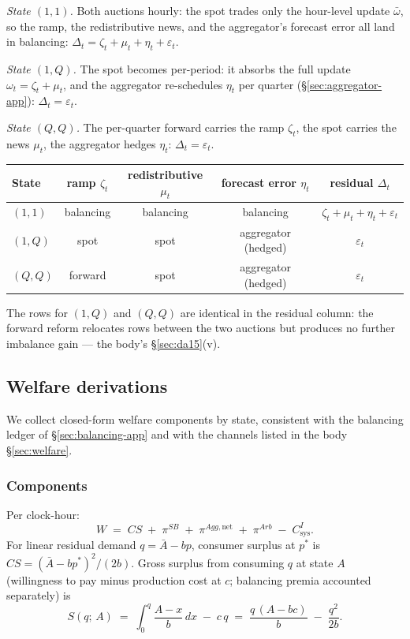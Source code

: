 \documentclass[11pt,a4paper]{article}
\theoremstyle{definition}
\theoremstyle{remark}
\theoremstyle{plain}
\begin{document}
\emph{State $(1,1)$.} Both auctions hourly: the spot trades only the hour-level update $\bar\omega$, so the ramp, the redistributive news, and the aggregator's forecast error all land in balancing: $\Delta_t = \zeta_t + \mu_t + \eta_t + \varepsilon_t$.

\emph{State $(1,Q)$.} The spot becomes per-period: it absorbs the full update $\omega_t = \zeta_t + \mu_t$, and the aggregator re-schedules $\eta_t$ per quarter (\S\ref{sec:aggregator-app}): $\Delta_t = \varepsilon_t$.

\emph{State $(Q,Q)$.} The per-quarter forward carries the ramp $\zeta_t$, the spot carries the news $\mu_t$, the aggregator hedges $\eta_t$: $\Delta_t = \varepsilon_t$.

\begin{center}
\footnotesize
\begin{tabular}{l c c c c}
\toprule
State & ramp $\zeta_t$ & redistributive $\mu_t$ & forecast error $\eta_t$ & residual $\Delta_t$ \\
\midrule
$(1,1)$ & balancing & balancing & balancing & $\zeta_t + \mu_t + \eta_t + \varepsilon_t$ \\
$(1,Q)$ & spot      & spot      & aggregator (hedged) & $\varepsilon_t$ \\
$(Q,Q)$ & forward   & spot      & aggregator (hedged) & $\varepsilon_t$ \\
\bottomrule
\end{tabular}
\end{center}

The rows for $(1,Q)$ and $(Q,Q)$ are identical in the residual column: the forward reform relocates rows between the two auctions but produces no further imbalance gain --- the body's \S\ref{sec:da15}(v).

\subsection{Welfare derivations}\label{sec:welfare-app}

We collect closed-form welfare components by state, consistent with the balancing ledger of \S\ref{sec:balancing-app} and with the channels listed in the body \S\ref{sec:welfare}.

\subsubsection{Components}

Per clock-hour:
\begin{equation}
W \;=\; CS \;+\; \pi^{SB} \;+\; \pi^{Agg,\text{net}} \;+\; \pi^{Arb} \;-\; C^I_{\text{sys}}.
\label{eq:welfare-app}
\end{equation}
For linear residual demand $q = \bar A - b p$, consumer surplus at $p^*$ is $CS = (\bar A - b p^*)^2/(2 b)$. Gross surplus from consuming $q$ at state $A$ (willingness to pay minus production cost at $c$; balancing premia accounted separately) is
\[
S(q;\, A) \;=\; \int_0^q \frac{A - x}{b}\,dx \;-\; c\,q \;=\; \frac{q\,(A - b c)}{b} \;-\; \frac{q^2}{2 b}.
\]
\end{document}
